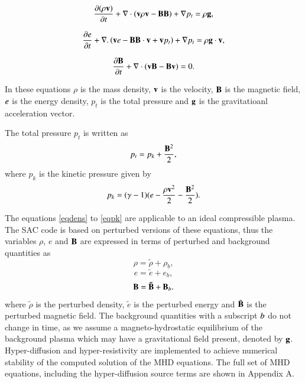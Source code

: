 \documentclass{aa}
\begin{document}
\begin{equation}\label{eqmom}
{{\partial ( \rho {\bf v})}\over{\partial t}}+\nabla\cdot\left( {\bf v}\rho {\bf v}-{\bf B B}\right)+\nabla p_t=\rho{\bf g},
\end{equation}

\begin{equation}\label{eqe}
{{\partial e}\over{\partial t}}+\nabla.\left({\bf v}e-{\bf B B}\cdot{\bf v}+{\bf v}p_{t}\right)+\nabla p_t=\rho{\bf g}\cdot{\bf v},
\end{equation}

\begin{equation}\label{eqb}
{{\partial{\bf B}}\over{\partial t}} +\nabla \cdot\left(  {\bf vB}-{\bf Bv}\right)=0.
\end{equation}

In these equations $\rho$ is the mass density, $  \bf { v} $ is the velocity,   $ \bf B$ is the magnetic field, $\it{e}$ is the energy density, $p_{t}$ is the total pressure and $\bf g$ is the gravitatioanl acceleration vector.

The total pressure $p_{t}$ is written as
\begin{equation}\label{eqpt}
p_{t}=p_{k}+{{\bf B}^{2}\over{2}},
\end{equation}
where $p_k$ is the kinetic pressure given by
\begin{equation}\label{eqpk}
p_{k}=(\gamma - 1)( e-{{\rho \bf v }^{2}\over{2}}-  {{\bf B}^{2}\over{2}} ).
\end{equation}

The equations \eqref{eqdens} to \eqref{eqpk} are applicable to an ideal compressible plasma. The SAC code is based on perturbed versions of these equations, thus the variables $\rho $, $e$ and  $\bf B$ are expressed in terms of perturbed and background quantities as
\begin{equation}
\rho = \tilde{\rho}+\rho _{b},
\end{equation}
\begin{equation}
e = \tilde{e}+e _{b},
\end{equation}
\begin{equation}
\bf B = \tilde{\bf B}+{\bf B}_{\it{b}}.
\end{equation}
where $\tilde{\rho}$ is the  perturbed density,  $\tilde{e}$ is the perturbed energy and $\tilde{\bf B}$  is the perturbed magnetic field. The background quantities with a subscript $\it{b}$ do not change in time, as we assume a magneto-hydrostatic equilibrium of the background plasma which may have a gravitational field present, denoted by $\bf g$. Hyper-diffusion and hyper-resistivity \cite{Caunt2001}
are implemented to achieve numerical stability of the computed solution of the MHD equations.  The full set of MHD equations, including the hyper-diffusion source terms are shown in Appendix A.
\end{document}
